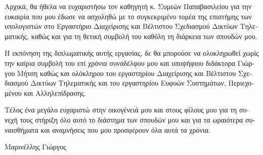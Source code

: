 \begin{greek}
\begin{acknowledgements}

Αρχικά, θα ήθελα να ευχαριστήσω τον καθηγητή κ. Συμεών Παπαβασιλείου για
την ευκαιρία που μου έδωσε να ασχοληθώ με το συγκεκριμένο τομέα της επιστήμης
των υπολογιστών στο Εργαστήριο Διαχείρισης και Βέλτιστου Σχεδιασμού Δικτύων Τηλεματικής,
καθώς και για τη θετική συμβολή του καθόλη τη διάρκεια των σπουδών μου.

Η εκπόνηση της διπλωματικής αυτής εργασίας, δε θα μπορούσε να ολοκληρωθεί χωρίς
την καίρια συμβολή του επί χρόνια συναδέλφου μου και υποψήφιου διδάκτορα Γιώργου Μήτση
καθώς και ολόκληρου του εργαστηρίου Διαχείρισης και Βέλτιστου Σχεδιασμού Δικτύων Τηλεματικής και του
εργαστηρίου Ευφυών Συστημάτων, Περιεχομένου και Αλληλεπίδρασης.

Τέλος ένα μεγάλο ευχαριστώ στην οικογένειά μου και στους φίλους μου για τη συνεχή
τους στήριξη όλο αυτό το διάστημα των σπουδών μου και για τα ωραιότερα συναισθήματα
και αναμνήσεις που μου προσφέρουν όλα αυτά τα χρόνια.

\begin{flushright}Μαρινέλλης Γιώργος\end{flushright}

\end{acknowledgements}
\end{greek}
